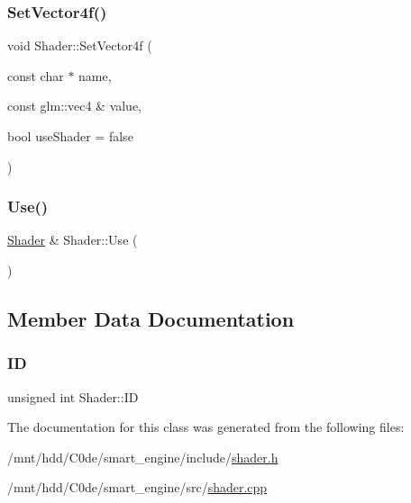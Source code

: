\mbox{\label{classShader_a6bd077475ad23d4eccaf0d4c695c668a}} 
\subsubsection{\texorpdfstring{Set\+Vector4f()}{SetVector4f()}\hspace{0.1cm}{\footnotesize\ttfamily [2/2]}}
{\footnotesize\ttfamily void Shader\+::\+Set\+Vector4f (\begin{DoxyParamCaption}\item[{const char $\ast$}]{name,  }\item[{const glm\+::vec4 \&}]{value,  }\item[{bool}]{use\+Shader = {\ttfamily false} }\end{DoxyParamCaption})}

\mbox{\label{classShader_a02292f4fdae284b29169db5da29e519a}} 
\subsubsection{\texorpdfstring{Use()}{Use()}}
{\footnotesize\ttfamily \hyperlink{classShader}{Shader} \& Shader\+::\+Use (\begin{DoxyParamCaption}{ }\end{DoxyParamCaption})}



\subsection{Member Data Documentation}
\mbox{\label{classShader_a142a08b6fbdfc982d82ca10ee0b0f38d}} 
\subsubsection{\texorpdfstring{ID}{ID}}
{\footnotesize\ttfamily unsigned int Shader\+::\+ID}



The documentation for this class was generated from the following files\+:\begin{DoxyCompactItemize}
\item 
/mnt/hdd/\+C0de/smart\+\_\+engine/include/\hyperlink{shader_8h}{shader.\+h}\item 
/mnt/hdd/\+C0de/smart\+\_\+engine/src/\hyperlink{shader_8cpp}{shader.\+cpp}\end{DoxyCompactItemize}
